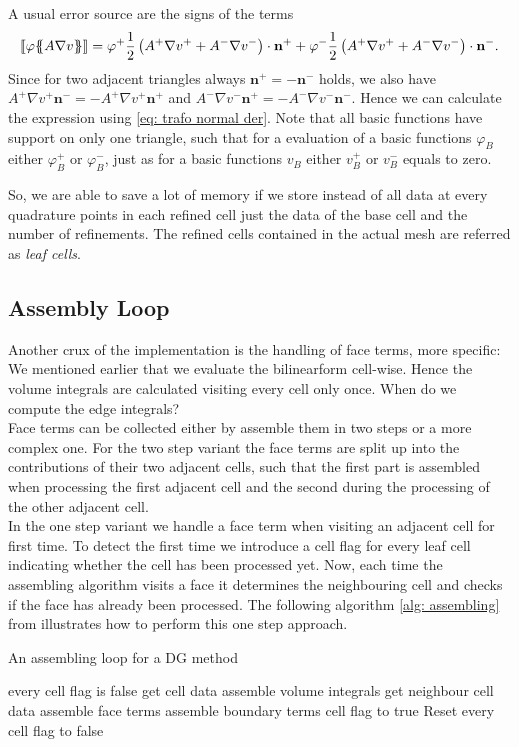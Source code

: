 \begin{example}
A usual error source are the signs of the terms
\[
	\llbracket \varphi \{\!\!\{  A \nabla v  \}\!\!\} \rrbracket = \varphi^+ \frac 1 2  \left(A^+ \nabla v^+ + A^- \nabla v^-\right) \cdot \mathbf n^+ + \varphi^- \frac 1 2 \left(A^+ \nabla v^+ + A^- \nabla v^-\right) \cdot \mathbf n^-.
\]
Since for two adjacent triangles always $\mathbf n^+ = - \mathbf n^-$ holds, we also have $A^+ \nabla v^+ \mathbf n^-= -A^+ \nabla v^+ \mathbf n^+$ and $A^- \nabla v^- \mathbf n^+= -A^- \nabla v^- \mathbf n^-$. Hence we can calculate the expression using \ref{eq: trafo normal der}. Note that all basic functions have support on only one triangle, such that for a evaluation of a basic functions $\varphi_B$ either $\varphi_B^+$ or $\varphi_B^-$, just as for a basic functions $v_B$ either $v_B^+$ or $v_B^-$ equals to zero.

So, we are able to save a lot of memory if we store instead of all data at every quadrature points in each refined cell just the data of the base cell and the number of refinements. The refined cells contained in the actual mesh are referred as \emph{leaf cells}.
\end{example}

\subsection{Assembly Loop}
Another crux of the implementation is the handling of face terms, more specific: We mentioned earlier that we evaluate the bilinearform cell-wise. Hence the volume integrals are calculated visiting every cell only once. When do we compute the edge integrals?\\
Face terms can be collected either by assemble them in two steps or a more complex one.
For the two step variant the face terms are split up into the contributions of their two adjacent cells, such that the first part is assembled when processing the first adjacent cell and the second during the processing of the other adjacent cell. \\
In the one step variant we handle a face term when visiting an adjacent cell for first time. To detect the first time we introduce a cell flag for every leaf cell indicating whether the cell has been processed yet. Now, each time the assembling algorithm visits a face it determines the neighbouring cell and checks if the face has already been processed. The following algorithm \ref{alg: assembling} from \cite{BMV2009} illustrates how to perform this one step approach. 
\begin{algorithm}[H]
\caption{An assembling loop for a DG method}
\label{alg: assembling}
\begin{algorithmic}
\Ensure every cell flag is false
\State get cell data
\State assemble volume integrals 
					\State get neighbour cell data
					\State assemble face terms
			\EndIf
		\Else
			\State assemble boundary terms
		\EndIf
\EndFor
	\State cell flag to true 
\EndFor
\State Reset every cell flag to false
\end{algorithmic}
\end{algorithm}

